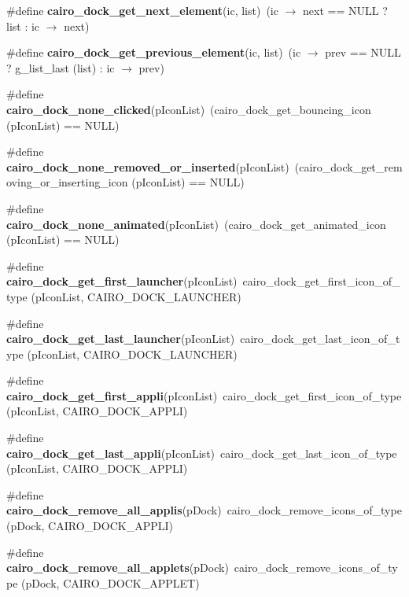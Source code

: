 \begin{CompactItemize}
\item 
\#define {\bf cairo\_\-dock\_\-get\_\-next\_\-element}(ic, list)~(ic $\rightarrow$ next == NULL ? list : ic $\rightarrow$ next)
\item 
\#define {\bf cairo\_\-dock\_\-get\_\-previous\_\-element}(ic, list)~(ic $\rightarrow$ prev == NULL ? g\_\-list\_\-last (list) : ic $\rightarrow$ prev)
\item 
\#define {\bf cairo\_\-dock\_\-none\_\-clicked}(pIconList)~(cairo\_\-dock\_\-get\_\-bouncing\_\-icon (pIconList) == NULL)
\item 
\#define {\bf cairo\_\-dock\_\-none\_\-removed\_\-or\_\-inserted}(pIconList)~(cairo\_\-dock\_\-get\_\-removing\_\-or\_\-inserting\_\-icon (pIconList) == NULL)
\item 
\#define {\bf cairo\_\-dock\_\-none\_\-animated}(pIconList)~(cairo\_\-dock\_\-get\_\-animated\_\-icon (pIconList) == NULL)
\item 
\#define {\bf cairo\_\-dock\_\-get\_\-first\_\-launcher}(pIconList)~cairo\_\-dock\_\-get\_\-first\_\-icon\_\-of\_\-type (pIconList, CAIRO\_\-DOCK\_\-LAUNCHER)
\item 
\#define {\bf cairo\_\-dock\_\-get\_\-last\_\-launcher}(pIconList)~cairo\_\-dock\_\-get\_\-last\_\-icon\_\-of\_\-type (pIconList, CAIRO\_\-DOCK\_\-LAUNCHER)
\item 
\#define {\bf cairo\_\-dock\_\-get\_\-first\_\-appli}(pIconList)~cairo\_\-dock\_\-get\_\-first\_\-icon\_\-of\_\-type (pIconList, CAIRO\_\-DOCK\_\-APPLI)
\item 
\#define {\bf cairo\_\-dock\_\-get\_\-last\_\-appli}(pIconList)~cairo\_\-dock\_\-get\_\-last\_\-icon\_\-of\_\-type (pIconList, CAIRO\_\-DOCK\_\-APPLI)
\item 
\#define {\bf cairo\_\-dock\_\-remove\_\-all\_\-applis}(pDock)~cairo\_\-dock\_\-remove\_\-icons\_\-of\_\-type (pDock, CAIRO\_\-DOCK\_\-APPLI)
\item 
\#define {\bf cairo\_\-dock\_\-remove\_\-all\_\-applets}(pDock)~cairo\_\-dock\_\-remove\_\-icons\_\-of\_\-type (pDock, CAIRO\_\-DOCK\_\-APPLET)
\end{CompactItemize}
